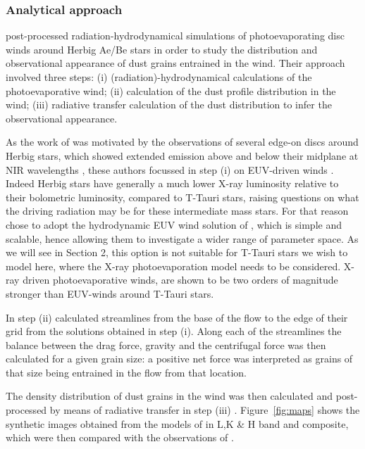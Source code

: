 \documentclass[10pt,fleqn,twoside]{article}
\begin{document}
\subsubsection{Analytical approach}\label{sec:analytical-approach}

\citet{2011MNRAS.411.1104O} post-processed
radiation-hydrodynamical simulations of photoevaporating disc winds
around Herbig Ae/Be stars in order to study the distribution and
observational appearance of dust grains entrained in the wind. Their
approach involved three steps: (i) (radiation)-hydrodynamical
calculations of the photoevaporative wind; (ii) calculation of the
dust profile distribution in the wind; (iii) radiative transfer
calculation of the dust distribution to infer the observational
appearance. 

As the work of \citet{2011MNRAS.411.1104O} was motivated by the
observations of several edge-on discs around Herbig stars, which
showed extended emission above and below their midplane at NIR
wavelengths \citep[e.g.,][]{1999AJ....117.1490P, 2006ApJ...645.1272P},
these
authors focussed in step (i)  on EUV-driven winds 
\citep[e.g.][]{1994ApJ...428..654H, 2004ApJ...607..890F, 
2006MNRAS.369..216A, 2006MNRAS.369..229A}. Indeed Herbig
stars have generally a much lower X-ray luminosity relative to their
bolometric luminosity, compared to T-Tauri stars, raising questions on
what the driving radiation may be for these intermediate mass stars. For
that reason \citet{2011MNRAS.411.1104O} chose to adopt the
hydrodynamic EUV wind solution of \citet{2004ApJ...607..890F},
which is simple and
scalable, hence allowing them to investigate a wider range of
parameter space. As we will see in Section 2, this option is not
suitable for T-Tauri stars we wish to model here, where the X-ray
photoevaporation model needs to be considered. X-ray driven
photoevaporative winds, are shown to be two orders of
magnitude stronger than EUV-winds around T-Tauri
stars. 

In step (ii) \citet{2011MNRAS.411.1104O} calculated streamlines
from the base of the flow to the edge of their grid from the solutions
obtained in step (i). Along each of the streamlines the balance
between the drag force, gravity and the centrifugal force was then
calculated for a given grain size: a positive net force was interpreted
as grains of that size being entrained in the flow from that
location. 

The density distribution of dust grains in the wind was
then calculated and post-processed by means of radiative
transfer in step (iii) . Figure~\ref{fig:maps} shows the synthetic images 
obtained from the models of \citet{2011MNRAS.411.1104O} in L,K \&
H band and composite, which were then compared 
with the observations of \citet{2006ApJ...645.1272P}. 
\end{document}
